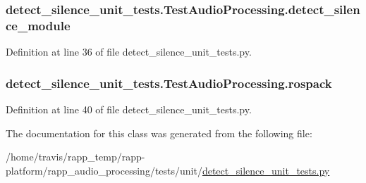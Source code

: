 \hypertarget{classdetect__silence__unit__tests_1_1TestAudioProcessing_a091f6edd6c581d6bfb165a2aca2fd170}{
\subsubsection[{detect\-\_\-silence\-\_\-module}]{\setlength{\rightskip}{0pt plus 5cm}detect\-\_\-silence\-\_\-unit\-\_\-tests.\-Test\-Audio\-Processing.\-detect\-\_\-silence\-\_\-module}}\label{classdetect__silence__unit__tests_1_1TestAudioProcessing_a091f6edd6c581d6bfb165a2aca2fd170}


Definition at line 36 of file detect\-\_\-silence\-\_\-unit\-\_\-tests.\-py.

\hypertarget{classdetect__silence__unit__tests_1_1TestAudioProcessing_a484d0d9f66b7ff88516f206070db6afb}{
\subsubsection[{rospack}]{\setlength{\rightskip}{0pt plus 5cm}detect\-\_\-silence\-\_\-unit\-\_\-tests.\-Test\-Audio\-Processing.\-rospack}}\label{classdetect__silence__unit__tests_1_1TestAudioProcessing_a484d0d9f66b7ff88516f206070db6afb}


Definition at line 40 of file detect\-\_\-silence\-\_\-unit\-\_\-tests.\-py.



The documentation for this class was generated from the following file\-:\begin{DoxyCompactItemize}
\item 
/home/travis/rapp\-\_\-temp/rapp-\/platform/rapp\-\_\-audio\-\_\-processing/tests/unit/\hyperlink{detect__silence__unit__tests_8py}{detect\-\_\-silence\-\_\-unit\-\_\-tests.\-py}\end{DoxyCompactItemize}
